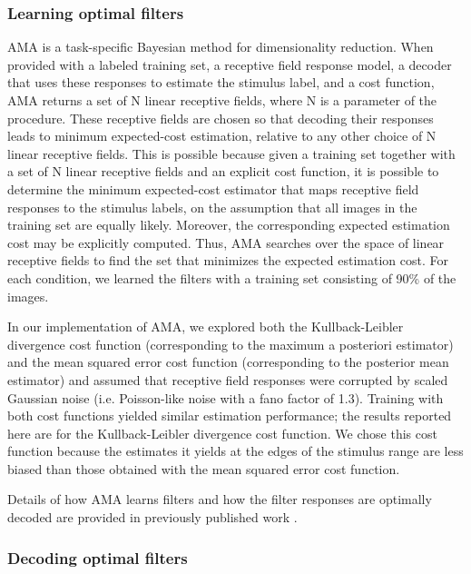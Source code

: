 \documentclass{jov}
\begin{document}
\subsubsection*{Learning optimal filters}
AMA is a task-specific Bayesian method for dimensionality reduction.
When provided with a labeled training set, a receptive field response model, a decoder that uses these responses to estimate the stimulus label, and a cost function, AMA returns a set of N linear receptive fields, where N is a parameter of the procedure.
These receptive fields are chosen so that decoding their responses leads to minimum expected-cost estimation, relative to any other choice of N linear receptive fields.
This is possible because given a training set together with a set of N linear receptive fields and an explicit cost function, it is possible to determine the minimum expected-cost estimator that maps receptive field responses to the stimulus labels, on the assumption that all images in the training set are equally likely.
Moreover, the corresponding expected estimation cost may be explicitly computed.
Thus, AMA searches over the space of linear receptive fields to find the set that minimizes the expected estimation cost.
For each condition, we learned the filters with a training set consisting of 90\% of the images.

In our implementation of AMA, we explored both the Kullback-Leibler divergence cost function (corresponding to the maximum a posteriori estimator) and the mean squared error cost function (corresponding to the posterior mean estimator) and assumed that receptive field responses were corrupted by scaled Gaussian noise (i.e. Poisson-like noise with a fano factor of 1.3).
Training with both cost functions yielded similar estimation performance; the results reported here are for the Kullback-Leibler divergence cost function.
We chose this cost function because the estimates it yields at the edges of the stimulus range are less biased than those obtained with the mean squared error cost function.

Details of how AMA learns filters and how the filter responses are optimally decoded are provided in previously published work \cite{geisler2009optimal,burge2017accuracy,jaini2017linking}.

\subsubsection*{Decoding optimal filters}
\end{document}
